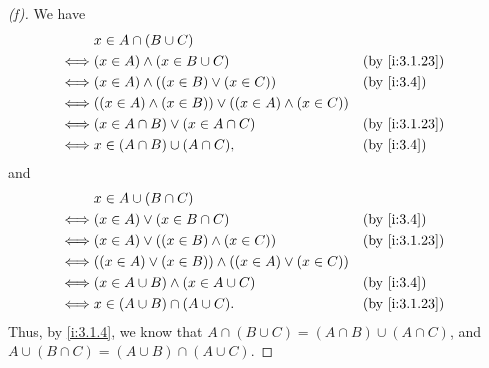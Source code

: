 \begin{proof}[(f)]
  We have
  \begin{align*}
         & x \in A \cap (B \cup C)                                                         \\
    \iff & (x \in A) \land (x \in B \cup C)                             &  & \by{i:3.1.23} \\
    \iff & (x \in A) \land ((x \in B) \lor (x \in C))                   &  & \by{i:3.4}    \\
    \iff & ((x \in A) \land (x \in B)) \lor ((x \in A) \land (x \in C))                    \\
    \iff & (x \in A \cap B) \lor (x \in A \cap C)                       &  & \by{i:3.1.23} \\
    \iff & x \in (A \cap B) \cup (A \cap C),                            &  & \by{i:3.4}
  \end{align*}
  and
  \begin{align*}
         & x \in A \cup (B \cap C)                                                        \\
    \iff & (x \in A) \lor (x \in B \cap C)                             &  & \by{i:3.4}    \\
    \iff & (x \in A) \lor ((x \in B) \land (x \in C))                  &  & \by{i:3.1.23} \\
    \iff & ((x \in A) \lor (x \in B)) \land ((x \in A) \lor (x \in C))                    \\
    \iff & (x \in A \cup B) \land (x \in A \cup C)                     &  & \by{i:3.4}    \\
    \iff & x \in (A \cup B) \cap (A \cup C).                           &  & \by{i:3.1.23}
  \end{align*}
  Thus, by \cref{i:3.1.4}, we know that \(A \cap (B \cup C) = (A \cap B) \cup (A \cap C)\), and \(A \cup (B \cap C) = (A \cup B) \cap (A \cup C)\).
\end{proof}

